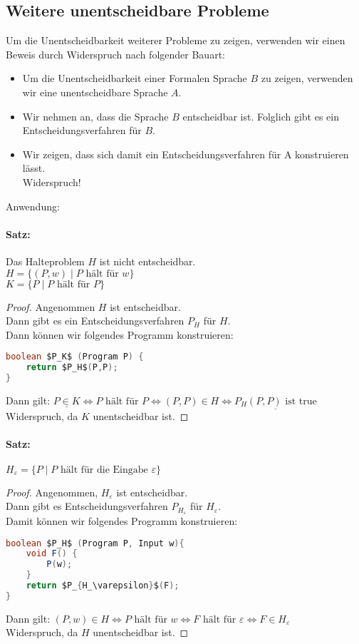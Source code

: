 \documentclass{scrreprt}
\begin{document}
\subsection{Weitere unentscheidbare Probleme}
Um die Unentscheidbarkeit weiterer Probleme zu zeigen, verwenden wir einen Beweis durch Widerspruch nach folgender Bauart:
\begin{itemize}
\item Um die Unentscheidbarkeit einer Formalen Sprache $B$ zu zeigen, verwenden wir eine unentscheidbare Sprache $A$.
\item Wir nehmen an, dass die Sprache $B$ entscheidbar ist. Folglich gibt es ein Entscheidungsverfahren für $B$.
\item Wir zeigen, dass sich damit ein Entscheidungsverfahren für A konstruieren lässt.\\
Widerspruch!
\end{itemize}

Anwendung:
\paragraph{Satz:} Das Halteproblem $H$ ist nicht entscheidbar.\\
$H=\{(P,w)\;|\; P \text{ hält für }w \}$\\
$K=\{P\;|\;P \text{ hält für } P\}$
\begin{proof}
Angenommen $H$ ist entscheidbar. \\
Dann gibt es ein Entscheidungsverfahren $P_H$ für $H$. \\
Dann können wir folgendes Programm konstruieren:
\begin{lstlisting}[language=Java]
boolean $P_K$ (Program P) {
	return $P_H$(P,P);
}
\end{lstlisting}
Dann gilt: $\underline{P\in K} \Leftrightarrow P \text{ hält für } P \Leftrightarrow (P,P) \in H \Leftrightarrow \underline{P_H(P,P) \text{ ist true}}$\\
Widerspruch, da $K$ unentscheidbar ist.
\end{proof}
\paragraph{Satz:} $H_\varepsilon = \{P \;|\; P \text{ hält für die Eingabe }\varepsilon\}$
\begin{proof}
Angenommen, $H_\varepsilon$ ist entscheidbar.\\
Dann gibt es Entscheidungsverfahren $P_{H_\varepsilon}$ für $H_\varepsilon$.\\
Damit können wir folgendes Programm konstruieren:
\begin{lstlisting}[language=Java]
boolean $P_H$ (Program P, Input w){
	void F() {
		P(w);
	}
	return $P_{H_\varepsilon}$(F);
}
\end{lstlisting}
Dann gilt: $(P,w) \in H \Leftrightarrow P \text{ hält für }w \Leftrightarrow F \text{ hält für }\varepsilon \Leftrightarrow F \in H_\varepsilon$\\
Widerspruch, da $H$ unentscheidbar ist.
\end{proof}
\end{document}
